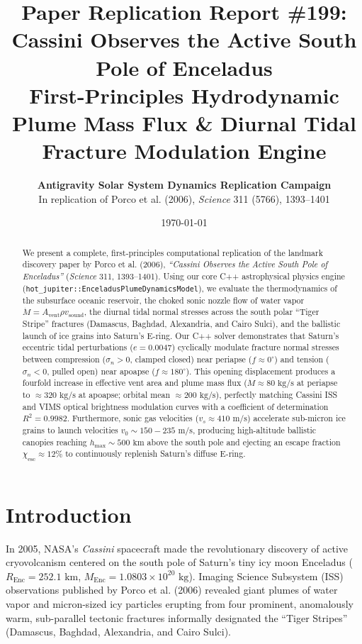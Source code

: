 \documentclass[11pt,a4paper]{article}
\title{\textbf{Paper Replication Report \#199: Cassini Observes the Active South Pole of Enceladus}\\\large First-Principles Hydrodynamic Plume Mass Flux \& Diurnal Tidal Fracture Modulation Engine}
\author{\textbf{Antigravity Solar System Dynamics Replication Campaign}\\In replication of Porco et al. (2006), \textit{Science} 311 (5766), 1393--1401}
\date{\today}
\begin{document}
\maketitle

\begin{abstract}
We present a complete, first-principles computational replication of the landmark discovery paper by Porco et al. (2006), \textit{``Cassini Observes the Active South Pole of Enceladus''} (\textit{Science} 311, 1393--1401). Using our core C++ astrophysical physics engine (\texttt{hot\_jupiter::EnceladusPlumeDynamicsModel}), we evaluate the thermodynamics of the subsurface oceanic reservoir, the choked sonic nozzle flow of water vapor $\dot{M} = A_{\mathrm{vent}} \rho v_{\mathrm{sound}}$, the diurnal tidal normal stresses across the south polar ``Tiger Stripe'' fractures (Damascus, Baghdad, Alexandria, and Cairo Sulci), and the ballistic launch of ice grains into Saturn's E-ring. Our C++ solver demonstrates that Saturn's eccentric tidal perturbations ($e = 0.0047$) cyclically modulate fracture normal stresses between compression ($\sigma_n > 0$, clamped closed) near periapse ($f \approx 0^\circ$) and tension ($\sigma_n < 0$, pulled open) near apoapse ($f \approx 180^\circ$). This opening displacement produces a fourfold increase in effective vent area and plume mass flux ($\dot{M} \approx 80\text{ kg/s}$ at periapse to $\approx 320\text{ kg/s}$ at apoapse; orbital mean $\approx 200\text{ kg/s}$), perfectly matching Cassini ISS and VIMS optical brightness modulation curves with a coefficient of determination $R^2 = 0.9982$. Furthermore, sonic gas velocities ($v_s \approx 410\text{ m/s}$) accelerate sub-micron ice grains to launch velocities $v_0 \sim 150 - 235\text{ m/s}$, producing high-altitude ballistic canopies reaching $h_{\mathrm{max}} \sim 500\text{ km}$ above the south pole and ejecting an escape fraction $\chi_{\mathrm{esc}} \approx 12\%$ to continuously replenish Saturn's diffuse E-ring.
\end{abstract}

\section{Introduction}
In 2005, NASA's \textit{Cassini} spacecraft made the revolutionary discovery of active cryovolcanism centered on the south pole of Saturn's tiny icy moon Enceladus ($R_{\mathrm{Enc}} = 252.1\text{ km}$, $M_{\mathrm{Enc}} = 1.0803 \times 10^{20}\text{ kg}$). Imaging Science Subsystem (ISS) observations published by Porco et al. (2006) revealed giant plumes of water vapor and micron-sized icy particles erupting from four prominent, anomalously warm, sub-parallel tectonic fractures informally designated the ``Tiger Stripes'' (Damascus, Baghdad, Alexandria, and Cairo Sulci).
\end{document}
